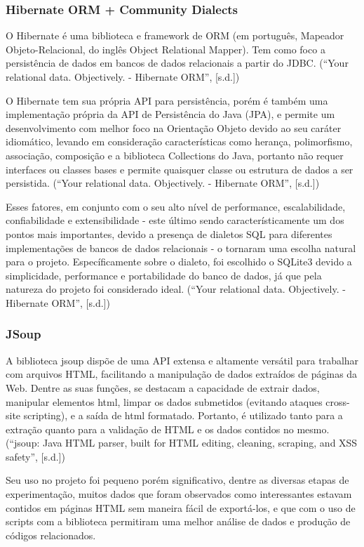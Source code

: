 \documentclass[a4paper,12pt]{article}
\begin{document}
\subsubsection{Hibernate ORM + Community Dialects}
O Hibernate é uma biblioteca e framework de ORM (em português, Mapeador Objeto-Relacional, do inglês Object Relational Mapper). 
Tem como foco a persistência de dados em bancos de dados relacionais a partir do JDBC. (“Your relational data. Objectively. - Hibernate ORM”, [s.d.])

O Hibernate tem sua própria API para persistência, porém é também uma implementação própria da API de Persistência do Java (JPA), 
e permite um desenvolvimento com melhor foco na Orientação Objeto devido ao seu caráter idiomático, levando em consideração 
características como herança, polimorfismo, associação, composição e a biblioteca Collections do Java, portanto não requer 
interfaces ou classes bases e permite quaisquer classe ou estrutura de dados a ser persistida. (“Your relational data. Objectively. - Hibernate ORM”, [s.d.])

Esses fatores, em conjunto com o seu alto nível de performance, escalabilidade, confiabilidade e extensibilidade - este último 
sendo característicamente um dos pontos mais importantes, devido a presença de dialetos SQL para diferentes implementações de 
bancos de dados relacionais - o tornaram uma escolha natural para o projeto. Específicamente sobre o dialeto, foi escolhido o 
SQLite3 devido a simplicidade, performance e portabilidade do banco de dados, já que pela natureza do projeto foi considerado ideal. (“Your relational data. Objectively. - Hibernate ORM”, [s.d.])

\subsubsection{JSoup}
A biblioteca jsoup dispõe de uma API extensa e altamente versátil para trabalhar com arquivos HTML, facilitando a manipulação de 
dados extraídos de páginas da Web. Dentre as suas funções, se destacam a capacidade de extrair dados, manipular elementos html, 
limpar os dados submetidos (evitando ataques cross-site scripting), e a saída de html formatado. Portanto, é utilizado tanto para 
a extração quanto para a validação de HTML e os dados contidos no mesmo. (“jsoup: Java HTML parser, built for HTML editing, cleaning, scraping, and XSS safety”, [s.d.])

Seu uso no projeto foi pequeno porém significativo, dentre as diversas etapas de experimentação, muitos dados que foram observados 
como interessantes estavam contidos em páginas HTML sem maneira fácil de exportá-los, e que com o uso de scripts com a biblioteca 
permitiram uma melhor análise de dados e produção de códigos relacionados.
\end{document}
